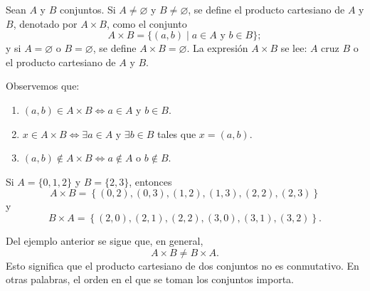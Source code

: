 \begin{definicion}{}{}
    Sean $A$ y $B$ conjuntos. Si $A \neq \varnothing$ y $B \neq \varnothing$, se define el producto cartesiano de $A$ y $B$, denotado por $A \times B$, como el conjunto
    $$A \times B = \{(a, b) \mid a \in A \text{ y } b \in B\};$$
    y si $A = \varnothing$ o $B = \varnothing$, se define $A \times B = \varnothing$. La expresión $A \times B$ se lee: $A$ cruz $B$ o el producto cartesiano de $A$ y $B$.
\end{definicion}

Observemos que:
\begin{enumerate}
    \item $(a, b) \in A \times B \Longleftrightarrow a \in A$ y $b \in B$.
    \item $x \in A \times B \Longleftrightarrow \exists a \in A$ y $\exists b \in B$ tales que $x = (a, b)$.
    \item $(a, b) \notin A \times B \Longleftrightarrow a \notin A$ o $b \notin B$.
\end{enumerate}

\begin{examplebox}{}{}
    Si $A = \{0, 1, 2\}$ y $B = \{2, 3\}$, entonces
    $$A \times B = \left\{(0, 2), (0, 3), (1, 2), (1, 3), (2, 2), (2, 3)\right\}$$
    y
    $$B \times A = \left\{(2, 0), (2, 1), (2, 2), (3, 0), (3, 1), (3, 2)\right\}.$$
\end{examplebox}

Del ejemplo anterior se sigue que, en general,
$$A \times B \neq B \times A.$$
Esto significa que el producto cartesiano de dos conjuntos no es conmutativo. En otras palabras, el orden en el que se toman los conjuntos importa.

